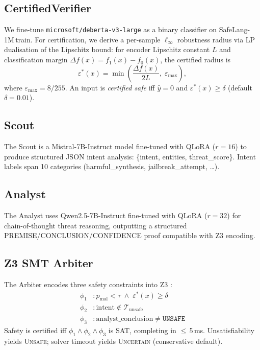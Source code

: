\documentclass[conference]{IEEEtran}
\begin{document}
\subsection{CertifiedVerifier}
We fine-tune \texttt{microsoft/deberta-v3-large} \cite{he2021debertav3} as a
binary classifier on SafeLang-1M\,train. For certification, we derive a
per-sample $\ell_\infty$ robustness radius via LP dualisation of the
Lipschitz bound: for encoder Lipschitz constant $L$ and classification margin
$\Delta f(x) = f_{1}(x) - f_{0}(x)$, the certified radius is
\begin{equation}
\varepsilon^*(x) = \min\!\left(\frac{\Delta f(x)}{2L},\; \varepsilon_{\max}\right),
\label{eq:cert}
\end{equation}
where $\varepsilon_{\max} = 8/255$. An input is \textit{certified safe} iff
$\hat{y} = 0$ and $\varepsilon^*(x) \geq \delta$ (default $\delta = 0.01$).

\subsection{Scout}
The Scout is a Mistral-7B-Instruct model \cite{jiang2023mistral} fine-tuned
with QLoRA ($r = 16$) to produce structured JSON intent analysis:
\{intent, entities, threat\_score\}. Intent labels span 10 categories
(harmful\_synthesis, jailbreak\_attempt, \dots).

\subsection{Analyst}
The Analyst uses Qwen2.5-7B-Instruct \cite{hui2024qwen2} fine-tuned with QLoRA
($r = 32$) for chain-of-thought threat reasoning, outputting a structured
PREMISE/CONCLUSION/CONFIDENCE proof compatible with Z3 encoding.

\subsection{Z3 SMT Arbiter}
The Arbiter encodes three safety constraints into Z3 \cite{demoura2008z3}:
\begin{align}
\phi_1 &: p_\text{mal} < \tau \;\land\; \varepsilon^*(x) \geq \delta \\
\phi_2 &: \text{intent} \notin \mathcal{T}_\text{unsafe} \\
\phi_3 &: \text{analyst\_conclusion} \neq \texttt{UNSAFE}
\end{align}
Safety is certified iff $\phi_1 \land \phi_2 \land \phi_3$ is SAT, completing
in $\leq$\,5\,ms. Unsatisfiability yields \textsc{Unsafe}; solver timeout
yields \textsc{Uncertain} (conservative default).
\end{document}
